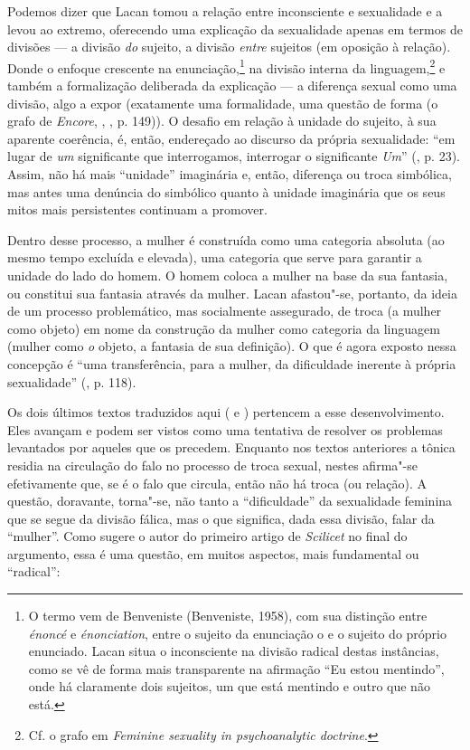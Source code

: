 Podemos dizer que Lacan tomou a relação entre inconsciente e sexualidade
e a levou ao extremo, oferecendo uma explicação da sexualidade apenas em
termos de divisões --- a divisão \emph{do} sujeito, a divisão
\emph{entre} sujeitos (em oposição à relação). Donde o enfoque crescente
na enunciação,\footnote{O termo vem de Benveniste (Benveniste, 1958), com
  sua distinção entre \emph{énoncé} e \emph{énonciation}, entre o
  sujeito da enunciação o e o sujeito do próprio enunciado. Lacan situa
  o inconsciente na divisão radical destas instâncias, como se vê de
  forma mais transparente na afirmação ``Eu estou mentindo'', onde há
  claramente dois sujeitos, um que está mentindo e outro que não está.}
na divisão interna da linguagem,\footnote{Cf. o grafo em \emph{Feminine
  sexuality in psychoanalytic doctrine}.} e também a formalização
deliberada da explicação --- a diferença sexual como uma divisão, algo a
expor (exatamente uma formalidade, uma questão de forma (o grafo de
\emph{Encore}, , , p. 149)). O desafio em relação à unidade
do sujeito, à sua aparente coerência, é, então, endereçado ao discurso
da própria sexualidade: ``em lugar de \emph{um} significante que
interrogamos, interrogar o significante \emph{Um}'' (, p. 23). Assim,
não há mais ``unidade'' imaginária e, então, diferença ou troca
simbólica, mas antes uma denúncia do simbólico quanto à unidade
imaginária que os seus mitos mais persistentes continuam a promover.

Dentro desse processo, a mulher é construída como uma categoria absoluta
(ao mesmo tempo excluída e elevada), uma categoria que serve para
garantir a unidade do lado do homem. O homem coloca a mulher na base da
sua fantasia, ou constitui sua fantasia através da mulher. Lacan
afastou"-se, portanto, da ideia de um processo problemático, mas
socialmente assegurado, de troca (a mulher como objeto) em nome da
construção da mulher como categoria da linguagem (mulher como \emph{o}
objeto, a fantasia de sua definição). O que é agora exposto nessa
concepção é ``uma transferência, para a mulher, da dificuldade inerente
à própria sexualidade'' (, p. 118).

Os dois últimos textos traduzidos aqui ( e ) pertencem a esse
desenvolvimento. Eles avançam e podem ser vistos como uma tentativa de
resolver os problemas levantados por aqueles que os precedem. Enquanto
nos textos anteriores a tônica residia na circulação do falo no processo
de troca sexual, nestes afirma"-se efetivamente que, se é o falo que
circula, então não há troca (ou relação). A questão, doravante,
torna"-se, não tanto a ``dificuldade'' da sexualidade feminina que se
segue da divisão fálica, mas o que significa, dada essa divisão, falar
da ``mulher''. Como sugere o autor do primeiro artigo de \emph{Scilicet}
no final do argumento, essa é uma questão, em muitos aspectos, mais
fundamental ou ``radical'':


